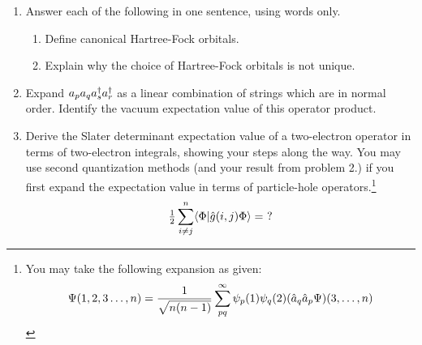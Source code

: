 \documentclass[11pt]{article}
\numberwithin{equation}{section}
\begin{document}
\begin{enumerate}
\item
  Answer each of the following in one sentence, using words only.
  \begin{enumerate}
  \item
    Define canonical Hartree-Fock orbitals.
    \vspace{2cm}
  \item
    Explain why the choice of Hartree-Fock orbitals is not unique.
    \vspace{2cm}
  \end{enumerate}

\item
  Expand $a_pa_qa_s^\dagger a_r^\dagger$ as a linear combination of strings which are in normal order.
  Identify the vacuum expectation value of this operator product.
  \vspace{11cm}

\item
  Derive the Slater determinant expectation value of a two-electron operator in terms of two-electron integrals, showing your steps along the way.
  You may use second quantization methods (and your result from problem 2.) if you first expand the expectation value in terms of particle-hole operators.\footnote{%
  You may take the following expansion as given:
  \begin{align*}
    \Psi (1,2,3\ldots,n)
  =
    \frac {1}{\sqrt{n(n-1)}}
    \sum_{pq}^\infty
    \psi _p(1)
    \psi _q(2)
    (\hat{a}_q\hat{a}_p\Psi )(3,\ldots,n)
  \end{align*}
  }
  \begin{align*}
    \tfrac{1}{2}
    \sum_{i\neq j}^n
    \langle\Phi |\hat{g}(i,j)\Phi \rangle
  =
    \,\,?
  \end{align*}
\end{enumerate}
\end{document}
